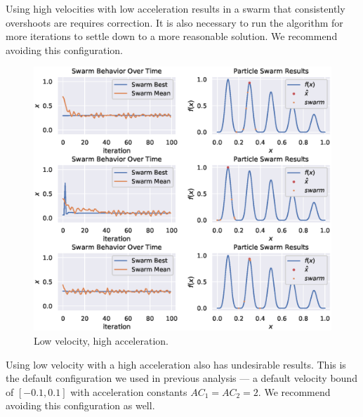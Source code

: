 \documentclass[12pt]{article}
\begin{document}
Using high velocities with low acceleration results in a swarm that consistently overshoots are requires correction.
It is also necessary to run the algorithm for more iterations to settle down to a more reasonable solution.
We recommend avoiding this configuration.

\begin{figure}[H]
    \centering
    \includegraphics[width=\textwidth]{figures/pso-low-vel-high-accel.eps}
    \caption{Low velocity, high acceleration.}\label{fig:pso:low-vel-high-accel}
\end{figure}

Using low velocity with a high acceleration also has undesirable results.
This is the default configuration we used in previous analysis --- a default velocity bound of $[-0.1, 0.1]$ with acceleration constants $AC_1 = AC_2 = 2$.
We recommend avoiding this configuration as well.
\end{document}
